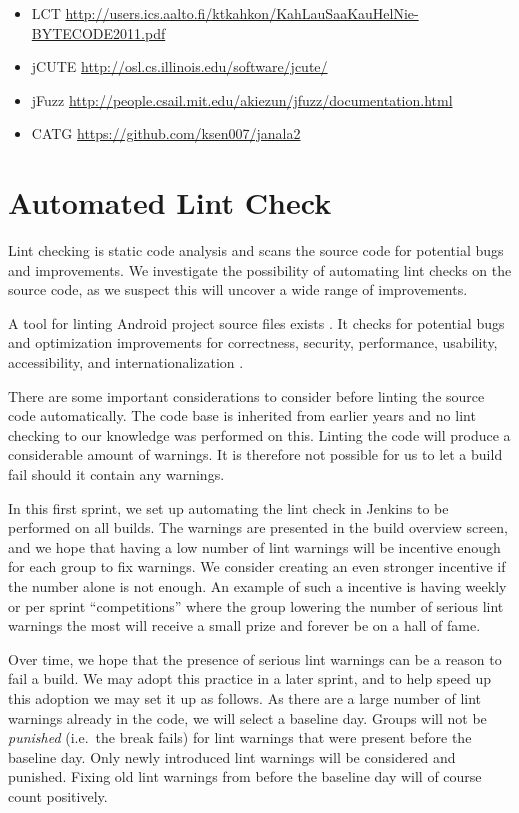 
\begin{itemize}
  \item LCT \url{http://users.ics.aalto.fi/ktkahkon/KahLauSaaKauHelNie-BYTECODE2011.pdf}
  \item jCUTE \url{http://osl.cs.illinois.edu/software/jcute/}
  \item jFuzz \url{http://people.csail.mit.edu/akiezun/jfuzz/documentation.html}
  \item CATG \url{https://github.com/ksen007/janala2}
\end{itemize}


\section{Automated Lint Check}\label{sec:automated_lint}
Lint checking is static code analysis and scans the source code for potential bugs and improvements. We investigate the possibility of automating lint checks on the source code, as we suspect this will uncover a wide range of improvements.

A tool for linting Android project source files exists . It checks for potential bugs and optimization improvements for correctness, security, performance, usability, accessibility, and internationalization \parencite{AndroidLint}.

There are some important considerations to consider before linting the source code automatically. The code base is inherited from earlier years and no lint checking to our knowledge was performed on this. Linting the code will produce a considerable amount of warnings. It is therefore not possible for us to let a build fail should it contain any warnings.

In this first sprint, we set up automating the lint check in Jenkins to be performed on all builds. The warnings are presented in the build overview screen, and we hope that having a low number of lint warnings will be incentive enough for each group to fix warnings. We consider creating an even stronger incentive if the number alone is not enough. An example of such a incentive is having weekly or per sprint ``competitions'' where the group lowering the number of serious lint warnings the most will receive a small prize and forever be on a hall of fame.

Over time, we hope that the presence of serious lint warnings can be a reason to fail a build. We may adopt this practice in a later sprint, and to help speed up this adoption we may set it up as follows. As there are a large number of lint warnings already in the code, we will select a baseline day. Groups will not be \emph{punished} (i.e.\ the break fails) for lint warnings that were present before the baseline day. Only newly introduced lint warnings will be considered and punished. Fixing old lint warnings from before the baseline day will of course count positively. %

